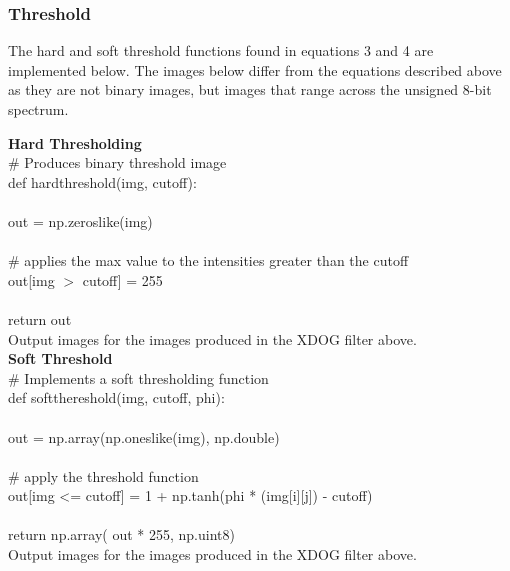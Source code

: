 \documentclass{article}
\begin{document}
	\subsubsection{Threshold}
		
	The hard and soft threshold functions found in equations 3 and 4 are implemented below. The images below differ from the equations described above as they are not binary images, but images that range across the unsigned 8-bit spectrum.\\
		
	\smallskip	
	
	\noindent \textbf{Hard Thresholding}\\
		
	\noindent \# Produces binary threshold image\\
	\noindent def hard\textunderscore threshold(img, cutoff):\\
	\\
	\indent out = np.zeros\textunderscore like(img)\\
	\\
	\indent \# applies the max value to the intensities greater than the cutoff\\
	\indent out[img $>$ cutoff] = 255\\
	\\	
	\indent return out\\
	
	Output images for the images produced in the XDOG filter above.\\
	
	\textbf{Soft Threshold}\\
	
	\noindent \# Implements a soft thresholding function\\
	def soft\textunderscore thereshold(img, cutoff, phi):\\
	\\
	\indent out = np.array(np.ones\textunderscore like(img), np.double)\\
	\\
	\indent \# apply the threshold function\\
	\indent out[img <= cutoff] = 1 + np.tanh(phi * (img[i][j]) - cutoff)\\
	\\
	\indent return np.array( out * 255, np.uint8)\\
	
	Output images for the images produced in the XDOG filter above.\\
	
\end{document}
